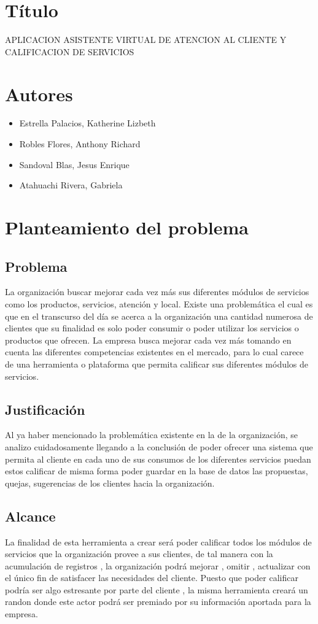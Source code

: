 \documentclass[preprint,12pt]{elsarticle}
\begin{document}
\section{Título}
APLICACION ASISTENTE VIRTUAL DE ATENCION AL CLIENTE Y CALIFICACION DE SERVICIOS

\section{Autores}
\begin{itemize}
	\item Estrella Palacios, Katherine Lizbeth
	\item Robles Flores, Anthony Richard
	\item Sandoval Blas, Jesus Enrique
	\item Atahuachi Rivera, Gabriela    
\end{itemize}

\section{Planteamiento del problema}
	\subsection{Problema }	
		La organización buscar mejorar cada vez más sus diferentes módulos de servicios como los productos, servicios, atención y local.
		Existe una problemática el cual es que en el transcurso del día se acerca a la organización una cantidad numerosa de clientes que su finalidad es solo poder consumir o poder utilizar los servicios o productos que ofrecen.
		La empresa busca mejorar cada vez más tomando en cuenta las diferentes competencias existentes en el mercado, para lo cual carece de una herramienta o plataforma que permita calificar sus diferentes módulos de servicios.

	\subsection{Justificación }	
		Al ya haber mencionado la problemática existente en la de la organización, se analizo cuidadosamente llegando  a la conclusión de poder ofrecer una sistema que permita al cliente en cada uno de sus consumos de los diferentes servicios puedan estos calificar de 			misma forma poder guardar en la base de datos las propuestas, quejas, sugerencias de los clientes hacia la organización.
	\subsection{Alcance }
		La finalidad de esta herramienta a crear será poder calificar todos los módulos de servicios que la organización provee a sus clientes, de tal manera con la acumulación de registros , la organización podrá mejorar , omitir , actualizar con el único fin de satisfacer las 			necesidades del cliente.
		Puesto que poder calificar podría ser algo estresante por parte del cliente , la misma herramienta creará un randon donde este actor podrá ser premiado por su información aportada para la empresa.
\end{document}
